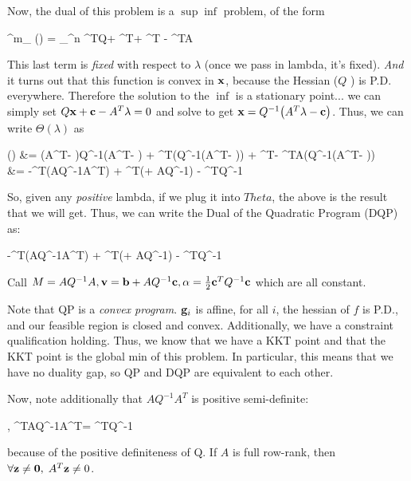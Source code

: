 Now, the dual of this problem is a $\sup \inf$ problem, of the form
\begin{frml}
	\forall \lambda \in \reals^m_{} \;
	\Theta(\lambda) = \inf_{\vx \in \reals^n} \vx^TQ\vx + \vc^T\vx + \lambda^T\vb
	- \lambda^TA\vx
\end{frml}
This last term is \textit{fixed} with respect to $\lambda$ (once we pass in
lambda, it's fixed). \textit{And} it turns out that this function is convex in
$\mathbf{x}$, because the Hessian ($Q$ ) is P.D. everywhere. Therefore the solution
to the $\inf$ is a stationary point... we can simply set 
$Q\mathbf{x} + \mathbf{c} - A^T\lambda = 0$ and solve to get 
$\mathbf{x} = Q^{-1}\big(A^T\lambda - \mathbf{c}\big)$.
Thus, we can write $\Theta(\lambda)$ as
\begin{frml}
	\Theta(\lambda) &= 
	\big(A^T\lambda - \vc\big)Q^{-1}\big(A^T\lambda - \vc\big) + 
	\vc^T\bigg(Q^{-1}\big(A^T\lambda - \vc\big)\bigg) + \lambda^T\vb -
	\lambda^TA\bigg(Q^{-1}\big(A^T\lambda - \vc\big)\bigg) \\
					&= -\lambda^T\bigg(AQ^{-1}A^T\bigg)\lambda
					+ \lambda^T\bigg(\vb + AQ^{-1}\vc\bigg) 
					- \vc^TQ^{-1}\vc
\end{frml}

So, given any \textit{positive} lambda, if we plug it into $Theta$, the above is
the result that we will get.
Thus, we can write the Dual of the Quadratic Program (DQP) as:
\begin{frml}
	\max \; -\lambda^T\bigg(AQ^{-1}A^T\bigg)\lambda
					+ \lambda^T\bigg(\vb + AQ^{-1}\vc\bigg) 
					- \vc^TQ^{-1}\vc \st \lambda \geq \vzero
\end{frml}

Call $M = AQ^{-1}A, \mathbf{v} = \mathbf{b} + AQ^{-1}\mathbf{c}, \alpha = \frac{1}{2}\mathbf{c}^TQ^{-1}\mathbf{c}$
which are all constant.

Note that QP is a \textit{convex program}. $\mathbf{g}_i$ is affine, for all $i$,
the hessian of $f$ is P.D., and our feasible region is closed and convex. 
Additionally, we have a constraint qualification holding.
Thus, we know that we have a KKT point and that the KKT point is the global min
of this problem. In particular, this means that we have no duality gap, so QP
and DQP are equivalent to each other.

Now, note additionally that $AQ^{-1}A^T$ is positive semi-definite:
\begin{frml}
	\forall \vz, \; \vz^TAQ^{-1}A^T\vz = \vy^TQ^{-1}\vy \geq 0
\end{frml}
because of the positive definiteness of Q.  If $A$ is full row-rank,
then $\forall \mathbf{z} \neq \mathbf{0}, \; A^T\mathbf{z} \neq 0 $.

